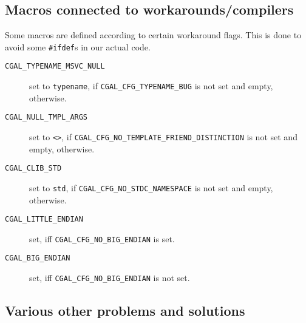 
\subsection{Macros connected to workarounds/compilers}
\label{sec:workaround_macros}

Some macros are defined according to certain workaround flags. This is
done to avoid some \texttt{\#ifdef}s in our actual code.

\begin{description}
\item[\texttt{CGAL\_TYPENAME\_MSVC\_NULL}] set to \texttt{typename},
  if {\texttt{CGAL\_CFG\_TYPENAME\_BUG}} is not set and
  empty, otherwise.
\item[\texttt{CGAL\_NULL\_TMPL\_ARGS}] set to \texttt{<>}, if
  {\texttt{CGAL\_CFG\_NO\_TEMPLATE\_FRIEND\_DISTINCTION}}
  is not set and empty, otherwise.
\item[\texttt{CGAL\_CLIB\_STD}] 
  set to \texttt{std}, if
  {\texttt{CGAL\_CFG\_NO\_STDC\_NAMESPACE}} is not set and
  empty, otherwise.
\item[\texttt{CGAL\_LITTLE\_ENDIAN}] set, iff
  {\texttt{CGAL\_CFG\_NO\_BIG\_ENDIAN}} is set.
\item[\texttt{CGAL\_BIG\_ENDIAN}] set, iff
  {\texttt{CGAL\_CFG\_NO\_BIG\_ENDIAN}} is not set.
\end{description}


\subsection{Various other problems and solutions}
\label{sec:various_problems}

